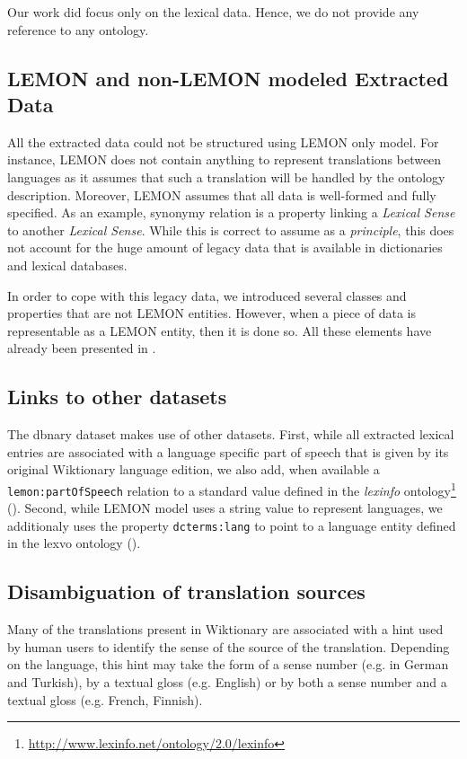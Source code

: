 \documentclass[10pt, a4paper]{article}
\begin{document}
Our work did focus only on the lexical data. Hence, we do not provide any reference to any ontology.  

\subsection{LEMON and non-LEMON modeled Extracted Data}

All the extracted data could not be structured using LEMON only model. For instance, LEMON does not contain anything to represent translations between languages as it assumes that such a translation will be handled by the ontology description. Moreover, LEMON assumes that all data is well-formed and fully specified. As an example, synonymy relation is a property linking a \textit{Lexical Sense} to another \textit{Lexical Sense}. While this is correct to assume as a \textit{principle}, this does not account for the huge amount of legacy data that is available in dictionaries and lexical databases.

In order to cope with this legacy data, we introduced several classes and properties that are not LEMON entities. However, when a piece of data is representable as a LEMON entity, then it is done so. All these elements have already been presented in \cite{serasset:dbnary-swj}.

\subsection{Links to other datasets}

The dbnary dataset makes use of other datasets. First, while all extracted lexical entries are associated with a language specific part of speech that is given by its original Wiktionary language edition, we also add, when available a \texttt{lemon:partOfSpeech} relation to a standard value defined in the \textit{lexinfo} ontology\footnote{\url{http://www.lexinfo.net/ontology/2.0/lexinfo}} (\cite{Lexinfo}). Second, while LEMON model uses a string value to represent languages, we additionaly uses the property \texttt{dcterms:lang} to point to a language entity defined in the lexvo ontology (\cite{deMeloWeikum2008c}).

\subsection{Disambiguation of translation sources}

Many of the translations present in Wiktionary are associated with a hint used by human users to identify the sense of the source of the translation. Depending on the language, this hint may take the form of a sense number (e.g. in German and Turkish), by a textual gloss (e.g. English) or by both a sense number and a textual gloss (e.g. French, Finnish).
\end{document}
